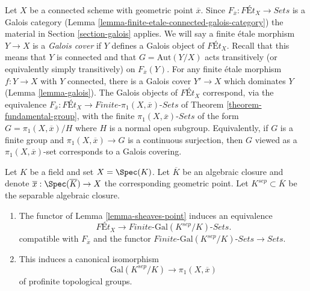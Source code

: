 \begin{remark}
\label{remark-finite-etale-under-galois}
Let $X$ be a connected scheme with geometric point $\overline{x}$.
Since $F_{\overline{x}} : \textit{F\'Et}_X \to \textit{Sets}$ is a
Galois category (Lemma \ref{lemma-finite-etale-connected-galois-category})
the material in Section \ref{section-galois} applies.
We will say a finite \'etale morphism $Y \to X$ is a
{\it Galois cover} if $Y$ defines a Galois object of
$\textit{F\'Et}_X$. Recall that this means that
$Y$ is connected and that $G = \text{Aut}(Y/X)$
acts transitively (or equivalently simply transitively)
on $F_{\overline{x}}(Y)$. For any finite \'etale
morphism $f : Y \to X$ with $Y$ connected, there is a Galois cover $Y' \to X$
which dominates $Y$ (Lemma \ref{lemma-galois}).
The Galois objects of $\textit{F\'Et}_X$ correspond,
via the equivalence
$F_{\overline{x}} : \textit{F\'Et}_X \to
\textit{Finite-}\pi_1(X, \overline{x})\textit{-Sets}$
of Theorem \ref{theorem-fundamental-group},
with the finite $\pi_1(X, \overline{x})\textit{-Sets}$
of the form $G = \pi_1(X, \overline{x})/H$ where $H$ is a
normal open subgroup. Equivalently, if $G$ is a finite group
and $\pi_1(X, \overline{x}) \to G$ is a continuous surjection,
then $G$ viewed as a $\pi_1(X, \overline{x})$-set corresponds
to a Galois covering.
\end{remark}

\begin{lemma}
\label{lemma-fundamental-group-Galois-group}
Let $K$ be a field and set $X = \Spec(K)$. Let $\overline{K}$ be an
algebraic closure and denote $\overline{x} : \Spec(\overline{K}) \to X$
the corresponding geometric point. Let $K^{sep} \subset \overline{K}$
be the separable algebraic closure.
\begin{enumerate}
\item The functor of Lemma \ref{lemma-sheaves-point} induces an equivalence
$$
\textit{F\'Et}_X \longrightarrow
\textit{Finite-}\text{Gal}(K^{sep}/K)\textit{-Sets}.
$$
compatible with $F_{\overline{x}}$ and the functor
$\textit{Finite-}\text{Gal}(K^{sep}/K)\textit{-Sets} \to \textit{Sets}$.
\item This induces a canonical isomorphism
$$
\text{Gal}(K^{sep}/K) \longrightarrow \pi_1(X, \overline{x})
$$
of profinite topological groups.
\end{enumerate}
\end{lemma}

